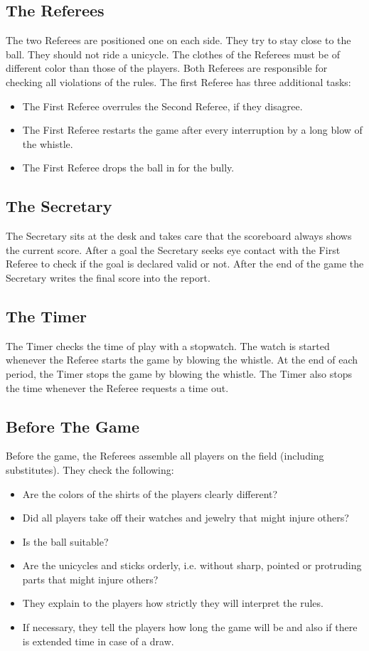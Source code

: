 \subsection{The Referees}
The two Referees are positioned one on each side.
They try to stay close to the ball.
They should not ride a unicycle.
The clothes of the Referees must be of different color than those of the players.
Both Referees are responsible for checking all violations of the rules.
The first Referee has three additional tasks:
\begin{itemize}
\item The First Referee overrules the Second Referee, if they disagree.
\item The First Referee restarts the game after every interruption by a long blow of the whistle.
\item The First Referee drops the ball in for the bully.
\end{itemize}

\subsection{The Secretary}
The Secretary sits at the desk and takes care that the scoreboard always shows the current score.
After a goal the Secretary seeks eye contact with the First Referee to check if the goal is declared valid or not.
After the end of the game the Secretary writes the final score into the report.

\subsection{The Timer}
The Timer checks the time of play with a stopwatch.
The watch is started whenever the Referee starts the game by blowing the whistle.
At the end of each period, the Timer stops the game by blowing the whistle.
The Timer also stops the time whenever the Referee requests a time out.

\subsection{Before The Game}
Before the game, the Referees assemble all players on the field (including substitutes).
They check the following:
\begin{itemize}
\item Are the colors of the shirts of the players clearly different?
\item Did all players take off their watches and jewelry that might injure others?
\item Is the ball suitable?
\item Are the unicycles and sticks orderly, i.e. without sharp, pointed or protruding parts that might injure others?
\item They explain to the players how strictly they will interpret the rules.
\item If necessary, they tell the players how long the game will be and also if there is extended time in case of a draw.
\end{itemize}

